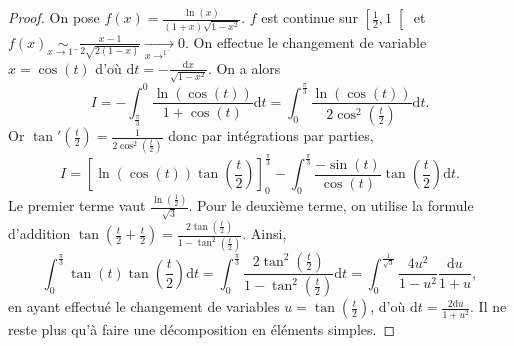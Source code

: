 \begin{proof}
    On pose $f(x)=\frac{\ln(x)}{(1+x)\sqrt{1-x^{2}}}$. $f$ est continue sur $\left[\frac{1}{2},1\right[$ et $f(x)\underset{x\to1^{-}}{\sim}\frac{x-1}{2\sqrt{2(1-x)}}\xrightarrow[x\to^{1^{-}}]{}0$. On effectue le changement de variable $x=\cos(t)$ d'où $\mathrm{d}t=-\frac{\mathrm{d}x}{\sqrt{1-x^{2}}}$. On a alors 
    \begin{equation}
        I=-\int_{\frac{\pi}{3}}^{0}\frac{\ln(\cos(t))}{1+\cos(t)}\mathrm{d}t=\int_{0}^{\frac{\pi}{3}}\frac{\ln(\cos(t))}{2\cos^{2}\left(\frac{t}{2}\right)}\mathrm{d}t.
    \end{equation}
    Or $\tan'\left(\frac{t}{2}\right)=\frac{1}{2\cos^{2}\left(\frac{t}{2}\right)}$ donc par intégrations par parties,
    \begin{equation}
        I=\left[\ln(\cos(t))\tan\left(\frac{t}{2}\right)\right]_{0}^{\frac{\pi}{3}}-\int_{0}^{\frac{\pi}{3}}\frac{-\sin(t)}{\cos(t)}\tan\left(\frac{t}{2}\right)\mathrm{d}t.
    \end{equation}
    Le premier terme vaut $\frac{\ln(\frac{1}{2})}{\sqrt{3}}$.
    Pour le deuxième terme, on utilise la formule d'addition $\tan\left(\frac{t}{2}+\frac{t}{2}\right)=\frac{2\tan\left(\frac{t}{2}\right)}{1-\tan^{2}\left(\frac{t}{2}\right)}$. Ainsi,
    \begin{equation}
        \int_{0}^{\frac{\pi}{3}}\tan(t)\tan\left(\frac{t}{2}\right)\mathrm{d}t=\int_{0}^{\frac{\pi}{3}}\frac{2\tan^{2}\left(\frac{t}{2}\right)}{1-\tan^{2}\left(\frac{t}{2}\right)}\mathrm{d}t=\int_{0}^{\frac{1}{\sqrt{3}}}\frac{4u^{2}}{1-u^{2}}\frac{\mathrm{d}u}{1+u},
    \end{equation}
    en ayant effectué le changement de variables $u=\tan\left(\frac{t}{2}\right)$, d'où $\mathrm{d}t=\frac{2\mathrm{d}u}{1+u^{2}}$. Il ne reste plus qu'à faire une décomposition en éléments simples.
\end{proof}

